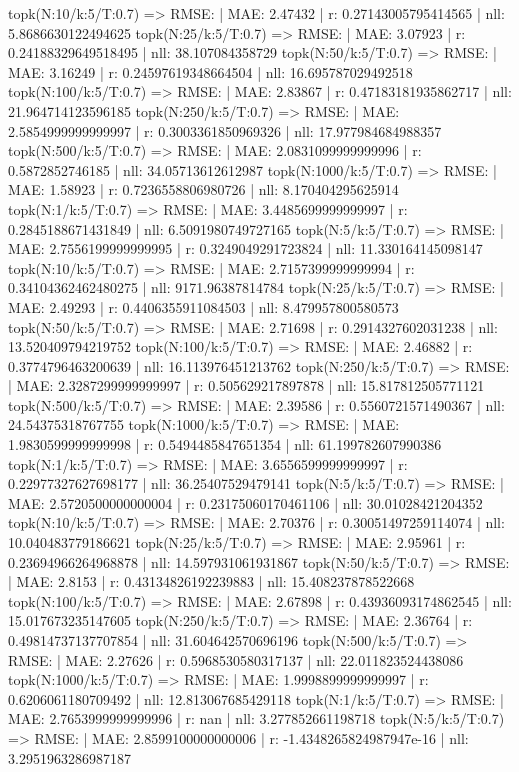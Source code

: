 topk(N:10/k:5/T:0.7) => RMSE: | MAE: 2.47432 | r: 0.27143005795414565 | nll: 5.8686630122494625
topk(N:25/k:5/T:0.7) => RMSE: | MAE: 3.07923 | r: 0.24188329649518495 | nll: 38.107084358729
topk(N:50/k:5/T:0.7) => RMSE: | MAE: 3.16249 | r: 0.24597619348664504 | nll: 16.695787029492518
topk(N:100/k:5/T:0.7) => RMSE: | MAE: 2.83867 | r: 0.47183181935862717 | nll: 21.964714123596185
topk(N:250/k:5/T:0.7) => RMSE: | MAE: 2.5854999999999997 | r: 0.3003361850969326 | nll: 17.977984684988357
topk(N:500/k:5/T:0.7) => RMSE: | MAE: 2.0831099999999996 | r: 0.5872852746185 | nll: 34.05713612612987
topk(N:1000/k:5/T:0.7) => RMSE: | MAE: 1.58923 | r: 0.7236558806980726 | nll: 8.170404295625914
topk(N:1/k:5/T:0.7) => RMSE: | MAE: 3.4485699999999997 | r: 0.2845188671431849 | nll: 6.5091980749727165
topk(N:5/k:5/T:0.7) => RMSE: | MAE: 2.7556199999999995 | r: 0.3249049291723824 | nll: 11.330164145098147
topk(N:10/k:5/T:0.7) => RMSE: | MAE: 2.7157399999999994 | r: 0.34104362462480275 | nll: 9171.96387814784
topk(N:25/k:5/T:0.7) => RMSE: | MAE: 2.49293 | r: 0.4406355911084503 | nll: 8.479957800580573
topk(N:50/k:5/T:0.7) => RMSE: | MAE: 2.71698 | r: 0.2914327602031238 | nll: 13.520409794219752
topk(N:100/k:5/T:0.7) => RMSE: | MAE: 2.46882 | r: 0.3774796463200639 | nll: 16.113976451213762
topk(N:250/k:5/T:0.7) => RMSE: | MAE: 2.3287299999999997 | r: 0.505629217897878 | nll: 15.817812505771121
topk(N:500/k:5/T:0.7) => RMSE: | MAE: 2.39586 | r: 0.5560721571490367 | nll: 24.54375318767755
topk(N:1000/k:5/T:0.7) => RMSE: | MAE: 1.9830599999999998 | r: 0.5494485847651354 | nll: 61.199782607990386
topk(N:1/k:5/T:0.7) => RMSE: | MAE: 3.6556599999999997 | r: 0.22977327627698177 | nll: 36.25407529479141
topk(N:5/k:5/T:0.7) => RMSE: | MAE: 2.5720500000000004 | r: 0.23175060170461106 | nll: 30.01028421204352
topk(N:10/k:5/T:0.7) => RMSE: | MAE: 2.70376 | r: 0.30051497259114074 | nll: 10.040483779186621
topk(N:25/k:5/T:0.7) => RMSE: | MAE: 2.95961 | r: 0.23694966264968878 | nll: 14.597931061931867
topk(N:50/k:5/T:0.7) => RMSE: | MAE: 2.8153 | r: 0.43134826192239883 | nll: 15.408237878522668
topk(N:100/k:5/T:0.7) => RMSE: | MAE: 2.67898 | r: 0.43936093174862545 | nll: 15.017673235147605
topk(N:250/k:5/T:0.7) => RMSE: | MAE: 2.36764 | r: 0.49814737137707854 | nll: 31.604642570696196
topk(N:500/k:5/T:0.7) => RMSE: | MAE: 2.27626 | r: 0.5968530580317137 | nll: 22.011823524438086
topk(N:1000/k:5/T:0.7) => RMSE: | MAE: 1.9998899999999997 | r: 0.6206061180709492 | nll: 12.813067685429118
topk(N:1/k:5/T:0.7) => RMSE: | MAE: 2.7653999999999996 | r: nan | nll: 3.277852661198718
topk(N:5/k:5/T:0.7) => RMSE: | MAE: 2.8599100000000006 | r: -1.4348265824987947e-16 | nll: 3.2951963286987187
